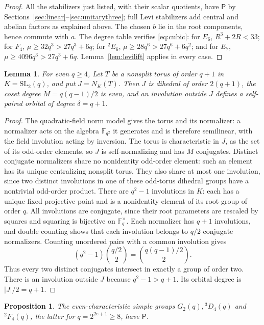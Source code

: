 \documentclass[11pt]{article}
\newtheorem{lemma}[theorem]{Lemma}
\newtheorem{proposition}[theorem]{Proposition}
\theoremstyle{definition}
\newcommand{\F}{\mathbb F}
\newcommand{\Pp}{\mathsf P}
\newcommand{\SL}{\mathrm{SL}}
\begin{document}
\begin{proof}
All the stabilizers just listed, with their scalar quotients, have $\Pp$ by Sections~\ref{sec:linear}--\ref{sec:unitarythree}; full Levi stabilizers add central and abelian factors as explained above. The chosen $b$ lie in the root components, hence commute with $a$. The degree table verifies \eqref{eq:cubic}: for $E_6$, $R^3+2R<33$; for $F_4$,
$\mu\ge32q^3>27q^3+6q$; for $^2E_6$, $\mu\ge28q^6>27q^6+6q^2$; and for $E_7$, $\mu\ge4096q^3>27q^3+6q$. Lemma~\ref{lem:levilift} applies in every case.
\end{proof}

\begin{lemma}\label{lem:torusnormalizer}
For even $q\ge4$, Let $T$ be a nonsplit torus of order $q+1$ in $K=\SL_2(q)$, and put $J=N_K(T)$. Then $J$ is dihedral of order $2(q+1)$, the coset degree $M=q(q-1)/2$ is even, and an involution outside $J$ defines a self-paired orbital of degree $\delta=q+1$.
\end{lemma}
\begin{proof}
The quadratic-field norm model gives the torus and its normalizer: a normalizer acts on the algebra $\F_{q^2}$ it generates and is therefore semilinear, with the field involution acting by inversion. The torus is characteristic in $J$, as the set of its odd-order elements, so $J$ is self-normalizing and has $M$ conjugates. Distinct conjugate normalizers share no nonidentity odd-order element: such an element has its unique centralizing nonsplit torus. They also share at most one involution, since two distinct involutions in one of these odd-torus dihedral groups have a nontrivial odd-order product. There are $q^2-1$ involutions in $K$: each has a unique fixed projective point and is a nonidentity element of its root group of order $q$. All involutions are conjugate, since their root parameters are rescaled by squares and squaring is bijective on $\F_q^\times$. Each normalizer has $q+1$ involutions, and double counting shows that each involution belongs to $q/2$ conjugate normalizers. Counting unordered pairs with a common involution gives
\[
(q^2-1)\binom{q/2}{2}=\binom{q(q-1)/2}{2}.
\]
Thus every two distinct conjugates intersect in exactly a group of order two. There is an involution outside $J$ because $q^2-1>q+1$. Its orbital degree is $|J|/2=q+1$.
\end{proof}
\begin{proposition}\label{prop:ranktwo}
The even-characteristic simple groups $G_2(q),{}^3D_4(q)$ and $^2F_4(q)$, the latter for $q=2^{2e+1}\ge8$, have $\Pp$.
\end{proposition}
\end{document}
